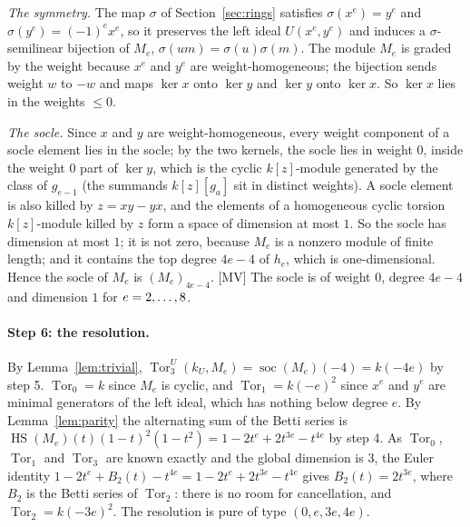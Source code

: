 \documentclass[11pt]{article}
\theoremstyle{definition}
\theoremstyle{remark}
\newcommand{\Tor}{\operatorname{Tor}}
\newcommand{\Hilb}{\operatorname{HS}}
\begin{document}
\emph{The symmetry.} The map $\sigma$ of Section~\ref{sec:rings} satisfies $\sigma(x^e)=y^e$ and $\sigma(y^e)=(-1)^ex^e$, so it preserves the left ideal $U(x^e,y^e)$ and induces a $\sigma$-semilinear bijection of $M_e$, $\sigma(um)=\sigma(u)\sigma(m)$. The module $M_e$ is graded by the weight because $x^e$ and $y^e$ are weight-homogeneous; the bijection sends weight $w$ to $-w$ and maps $\ker x$ onto $\ker y$ and $\ker y$ onto $\ker x$. So $\ker x$ lies in the weights $\le0$.

\emph{The socle.} Since $x$ and $y$ are weight-homogeneous, every weight component of a socle element lies in the socle; by the two kernels, the socle lies in weight $0$, inside the weight $0$ part of $\ker y$, which is the cyclic $k[z]$-module generated by the class of $g_{e-1}$ (the summands $k[z][g_a]$ sit in distinct weights). A socle element is also killed by $z=xy-yx$, and the elements of a homogeneous cyclic torsion $k[z]$-module killed by $z$ form a space of dimension at most $1$. So the socle has dimension at most $1$; it is not zero, because $M_e$ is a nonzero module of finite length; and it contains the top degree $4e-4$ of $h_e$, which is one-dimensional. Hence the socle of $M_e$ is $(M_e)_{4e-4}$. [MV] The socle is of weight $0$, degree $4e-4$ and dimension $1$ for $e=2,\dots,8$.

\paragraph{Step 6: the resolution.} By Lemma~\ref{lem:trivial}, $\Tor_3^U(k_U,M_e)=\operatorname{soc}(M_e)(-4)=k(-4e)$ by step 5. $\Tor_0=k$ since $M_e$ is cyclic, and $\Tor_1=k(-e)^2$ since $x^e$ and $y^e$ are minimal generators of the left ideal, which has nothing below degree $e$. By Lemma~\ref{lem:parity} the alternating sum of the Betti series is $\Hilb(M_e)(t)(1-t)^2(1-t^2)=1-2t^e+2t^{3e}-t^{4e}$ by step 4. As $\Tor_0$, $\Tor_1$ and $\Tor_3$ are known exactly and the global dimension is $3$, the Euler identity $1-2t^e+B_2(t)-t^{4e}=1-2t^e+2t^{3e}-t^{4e}$ gives $B_2(t)=2t^{3e}$, where $B_2$ is the Betti series of $\Tor_2$: there is no room for cancellation, and $\Tor_2=k(-3e)^2$. The resolution is pure of type $(0,e,3e,4e)$.
\end{document}
